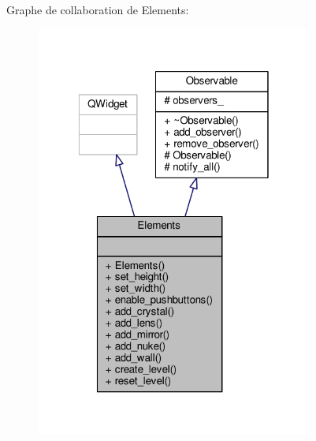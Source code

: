 Graphe de collaboration de Elements\+:
\nopagebreak
\begin{figure}[H]
\begin{center}
\leavevmode
\includegraphics[width=259pt]{d3/d60/classElements__coll__graph}
\end{center}
\end{figure}
